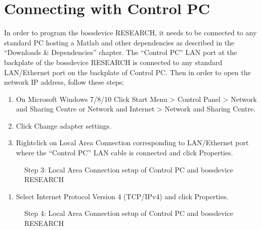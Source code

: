 \documentclass[letterpaper,10pt,english]{sphinxmanual}
\begin{document}
\section{Connecting with Control PC}
\label{\detokenize{2_setup_bossdevice_research:connecting-with-control-pc}}
\sphinxAtStartPar
In order to program the bossdevice RESEARCH, it needs to be connected to any standard PC hosting a Matlab and other dependencies as described in the “Downloads \& Dependencies” chapter. The “Control PC” LAN port at the backplate of the bossdevice RESEARCH is connected to any standard LAN/Ethernet port on the backplate of Control PC. Then in order to open the network IP address, follow these steps:
\begin{enumerate}
%
\item {} 
\sphinxAtStartPar
On Microsoft Windows 7/8/10 Click Start Menu \textgreater{} Control Panel \textgreater{} Network and Sharing Centre or Network and Internet \textgreater{} Network and Sharing Centre.

\item {} 
\sphinxAtStartPar
Click Change adapter settings.

\item {} 
\sphinxAtStartPar
Right\sphinxhyphen{}click on Local Area Connection corresponding to LAN/Ethernet port where the “Control PC” LAN cable is connected and click Properties.

\end{enumerate}

\begin{figure}[htbp]
\centering
\capstart

\noindent{}
\caption{Step 3: Local Area Connection setup of Control PC and bossdevice RESEARCH}\label{\detokenize{2_setup_bossdevice_research:id2}}\end{figure}
\begin{enumerate}
%
\setcounter{enumi}{3}
\item {} 
\sphinxAtStartPar
Select Internet Protocol Version 4 (TCP/IPv4) and click Properties.

\end{enumerate}

\begin{figure}[htbp]
\centering
\capstart

\noindent{}
\caption{Step 4: Local Area Connection setup of Control PC and bossdevice RESEARCH}\label{\detokenize{2_setup_bossdevice_research:id3}}\end{figure}
\end{document}
